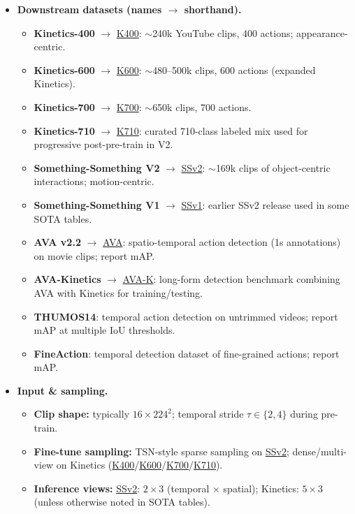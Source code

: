 \begin{enrichment}
\begin{enrichment}
\begin{itemize}
                \item \textbf{Downstream datasets (names $\rightarrow$ shorthand).}
                \begin{itemize}
                    \item \textbf{Kinetics-400} $\rightarrow$ \underline{K400}: $\sim$240k YouTube clips, 400 actions; appearance-centric.
                    \item \textbf{Kinetics-600} $\rightarrow$ \underline{K600}: $\sim$480–500k clips, 600 actions (expanded Kinetics).
                    \item \textbf{Kinetics-700} $\rightarrow$ \underline{K700}: $\sim$650k clips, 700 actions.
                    \item \textbf{Kinetics-710} $\rightarrow$ \underline{K710}: curated 710-class labeled mix used for progressive post-pre-train in V2.
                    \item \textbf{Something-Something V2} $\rightarrow$ \underline{SSv2}: $\sim$169k clips of object-centric interactions; motion-centric.
                    \item \textbf{Something-Something V1} $\rightarrow$ \underline{SSv1}: earlier SSv2 release used in some SOTA tables.
                    \item \textbf{AVA v2.2} $\rightarrow$ \underline{AVA}: spatio-temporal action detection (1s annotations) on movie clips; report mAP.
                    \item \textbf{AVA-Kinetics} $\rightarrow$ \underline{AVA-K}: long-form detection benchmark combining AVA with Kinetics for training/testing.
                    \item \textbf{THUMOS14}: temporal action detection on untrimmed videos; report mAP at multiple IoU thresholds.
                    \item \textbf{FineAction}: temporal detection dataset of fine-grained actions; report mAP.
                \end{itemize}
                
                \item \textbf{Input \& sampling.}
                \begin{itemize}
                    \item \textbf{Clip shape:} typically $16\times 224^2$; temporal stride $\tau\in\{2,4\}$ during pre-train.
                    \item \textbf{Fine-tune sampling:} TSN-style sparse sampling on \underline{SSv2}; dense/multi-view on Kinetics (\underline{K400}/\underline{K600}/\underline{K700}/\underline{K710}).
                    \item \textbf{Inference views:} \underline{SSv2}: $2\times 3$ (temporal $\times$ spatial); Kinetics: $5\times 3$ (unless otherwise noted in SOTA tables).
                \end{itemize}
                

\end{itemize}
\end{enrichment}
\end{enrichment}
